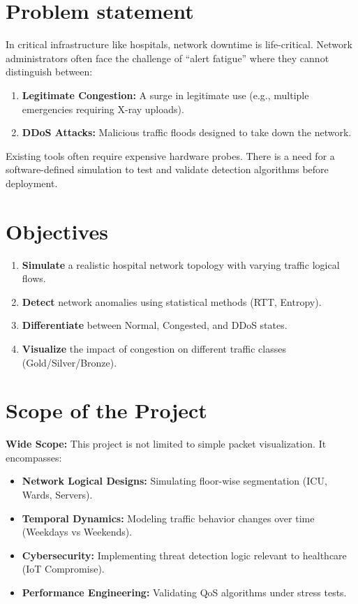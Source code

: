 \documentclass[12pt]{report}
\begin{document}
\section{Problem statement}
In critical infrastructure like hospitals, network downtime is life-critical. Network administrators often face the challenge of ``alert fatigue'' where they cannot distinguish between:
\begin{enumerate}
    \item \textbf{Legitimate Congestion:} A surge in legitimate use (e.g., multiple emergencies requiring X-ray uploads).
    \item \textbf{DDoS Attacks:} Malicious traffic floods designed to take down the network.
\end{enumerate}
Existing tools often require expensive hardware probes. There is a need for a software-defined simulation to test and validate detection algorithms before deployment.

\section{Objectives}
\begin{enumerate}
    \item \textbf{Simulate} a realistic hospital network topology with varying traffic logical flows.
    \item \textbf{Detect} network anomalies using statistical methods (RTT, Entropy).
    \item \textbf{Differentiate} between Normal, Congested, and DDoS states.
    \item \textbf{Visualize} the impact of congestion on different traffic classes (Gold/Silver/Bronze).
\end{enumerate}

\section{Scope of the Project}
\textbf{Wide Scope:}
This project is not limited to simple packet visualization. It encompasses:
\begin{itemize}
    \item \textbf{Network Logical Designs:} Simulating floor-wise segmentation (ICU, Wards, Servers).
    \item \textbf{Temporal Dynamics:} Modeling traffic behavior changes over time (Weekdays vs Weekends).
    \item \textbf{Cybersecurity:} Implementing threat detection logic relevant to healthcare (IoT Compromise).
    \item \textbf{Performance Engineering:} Validating QoS algorithms under stress tests.
\end{itemize}
\end{document}
